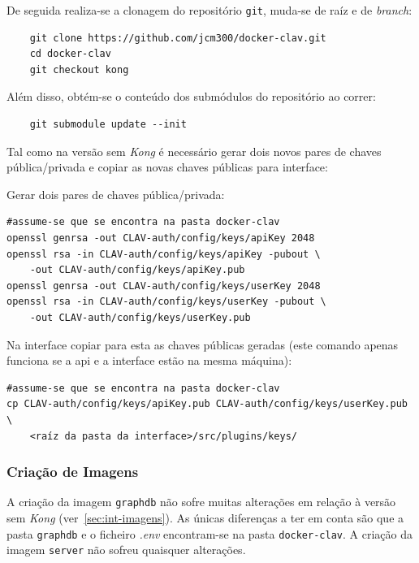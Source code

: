 De seguida realiza-se a clonagem do repositório \texttt{git}, muda-se de raíz e de \textit{branch}:

\footnotesize
\begin{verbatim}
    git clone https://github.com/jcm300/docker-clav.git
    cd docker-clav
    git checkout kong
\end{verbatim}
\normalsize

Além disso, obtém-se o conteúdo dos submódulos do repositório ao correr:

\footnotesize
\begin{verbatim}
    git submodule update --init
\end{verbatim}
\normalsize

Tal como na versão sem \textit{Kong} é necessário gerar dois novos pares de chaves pública/privada e copiar as novas chaves públicas para interface:

\footnotesize
\begin{center}
\begin{minipage}[t]{0.49\textwidth}
Gerar dois pares de chaves pública/privada:
\begin{verbatim}
#assume-se que se encontra na pasta docker-clav 
openssl genrsa -out CLAV-auth/config/keys/apiKey 2048
openssl rsa -in CLAV-auth/config/keys/apiKey -pubout \
    -out CLAV-auth/config/keys/apiKey.pub
openssl genrsa -out CLAV-auth/config/keys/userKey 2048
openssl rsa -in CLAV-auth/config/keys/userKey -pubout \
    -out CLAV-auth/config/keys/userKey.pub
\end{verbatim}
\end{minipage}%
\begin{minipage}[t]{0.49\textwidth}
Na interface copiar para esta as chaves públicas geradas (este comando apenas funciona se a \acrshort{api} e a interface estão na mesma máquina):
\begin{verbatim}
#assume-se que se encontra na pasta docker-clav 
cp CLAV-auth/config/keys/apiKey.pub CLAV-auth/config/keys/userKey.pub \
    <raíz da pasta da interface>/src/plugins/keys/
\end{verbatim}
\end{minipage}
\end{center}
\normalsize

\subsubsection{Criação de Imagens}

A criação da imagem \texttt{graphdb} não sofre muitas alterações em relação à versão sem \textit{Kong} (ver~\ref{sec:int-imagens}). As únicas diferenças a ter em conta são que a pasta \texttt{graphdb} e o ficheiro \textit{.env} encontram-se na pasta \texttt{docker-clav}. A criação da imagem \texttt{server} não sofreu quaisquer alterações.

